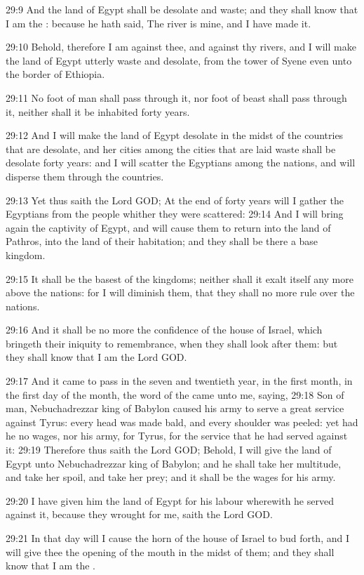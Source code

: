 29:9 And the land of Egypt shall be desolate and waste; and they shall know that I am the \LORD: because he hath said, The river is mine, and I have made it.

29:10 Behold, therefore I am against thee, and against thy rivers, and I will make the land of Egypt utterly waste and desolate, from the tower of Syene even unto the border of Ethiopia.

29:11 No foot of man shall pass through it, nor foot of beast shall pass through it, neither shall it be inhabited forty years.

29:12 And I will make the land of Egypt desolate in the midst of the countries that are desolate, and her cities among the cities that are laid waste shall be desolate forty years: and I will scatter the Egyptians among the nations, and will disperse them through the countries.

29:13 Yet thus saith the Lord GOD; At the end of forty years will I gather the Egyptians from the people whither they were scattered: 29:14 And I will bring again the captivity of Egypt, and will cause them to return into the land of Pathros, into the land of their habitation; and they shall be there a base kingdom.

29:15 It shall be the basest of the kingdoms; neither shall it exalt itself any more above the nations: for I will diminish them, that they shall no more rule over the nations.

29:16 And it shall be no more the confidence of the house of Israel, which bringeth their iniquity to remembrance, when they shall look after them: but they shall know that I am the Lord GOD.

29:17 And it came to pass in the seven and twentieth year, in the first month, in the first day of the month, the word of the \LORD came unto me, saying, 29:18 Son of man, Nebuchadrezzar king of Babylon caused his army to serve a great service against Tyrus: every head was made bald, and every shoulder was peeled: yet had he no wages, nor his army, for Tyrus, for the service that he had served against it: 29:19 Therefore thus saith the Lord GOD; Behold, I will give the land of Egypt unto Nebuchadrezzar king of Babylon; and he shall take her multitude, and take her spoil, and take her prey; and it shall be the wages for his army.

29:20 I have given him the land of Egypt for his labour wherewith he served against it, because they wrought for me, saith the Lord GOD.

29:21 In that day will I cause the horn of the house of Israel to bud forth, and I will give thee the opening of the mouth in the midst of them; and they shall know that I am the \LORD.

